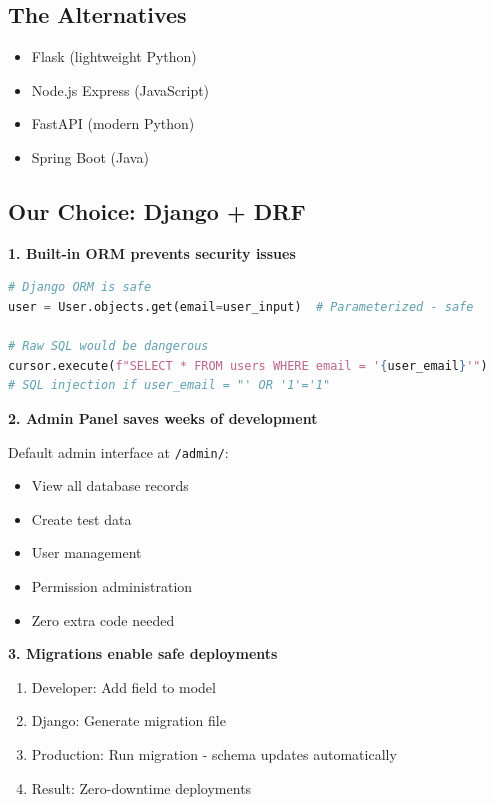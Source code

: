 \documentclass[11pt,a4paper,twoside]{report}
\begin{document}
\subsection{The Alternatives}
\begin{itemize}
    \item Flask (lightweight Python)
    \item Node.js Express (JavaScript)
    \item FastAPI (modern Python)
    \item Spring Boot (Java)
\end{itemize}

\subsection{Our Choice: Django + DRF}

\textbf{1. Built-in ORM prevents security issues}

\begin{lstlisting}[language=Python]
# Django ORM is safe
user = User.objects.get(email=user_input)  # Parameterized - safe

# Raw SQL would be dangerous
cursor.execute(f"SELECT * FROM users WHERE email = '{user_email}'")
# SQL injection if user_email = "' OR '1'='1"
\end{lstlisting}

\textbf{2. Admin Panel saves weeks of development}

Default admin interface at \texttt{/admin/}:
\begin{itemize}
    \item View all database records
    \item Create test data
    \item User management
    \item Permission administration
    \item Zero extra code needed
\end{itemize}

\textbf{3. Migrations enable safe deployments}

\begin{enumerate}
    \item Developer: Add field to model
    \item Django: Generate migration file
    \item Production: Run migration - schema updates automatically
    \item Result: Zero-downtime deployments
\end{enumerate}
\end{document}
